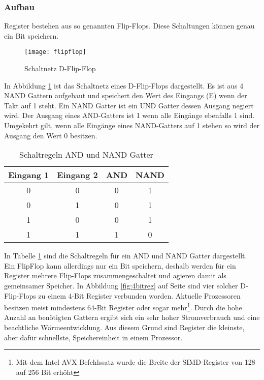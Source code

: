 \documentclass[12pt]{article}
\begin{document}
\subsubsection{Aufbau}
Register bestehen aus so genannten Flip-Flops. Diese Schaltungen können genau ein Bit speichern. 

\begin{figure}[!htb]
\centering
\texttt{[image: flipflop]}
\caption{Schaltnetz D-Flip-Flop}
\centering
\label{fig:flipflop}
\end{figure}

\noindent In Abbildung \ref{fig:flipflop} ist das Schaltnetz eines D-Flip-Flops dargestellt. Es ist aus 4 NAND Gattern aufgebaut und speichert den Wert des Eingangs (E) wenn der Takt auf 1 steht. Ein NAND Gatter ist ein UND Gatter dessen Ausgang negiert wird. Der Ausgang eines AND-Gatters ist 1 wenn alle Eingänge ebenfalls 1 sind. Umgekehrt gilt, wenn alle Eingänge eines NAND-Gatters auf 1 stehen so wird der Ausgang den Wert 0 besitzen.\cite[S.12-14]{elements2005}

\begin{table}[!htb]
\centering
\begin{tabular}{|c|c|c|c|}
\hline
Eingang 1 & Eingang 2 & AND & NAND \\ \hline
0         & 0         & 0   & 1    \\ \hline
0         & 1         & 0   & 1    \\ \hline
1         & 0         & 0   & 1    \\ \hline
1         & 1         & 1   & 0    \\ \hline
\end{tabular}
\caption{Schaltregeln AND und NAND Gatter}
\label{andnand}
\end{table}

\noindent In Tabelle \ref{andnand} sind die Schaltregeln für ein AND und NAND Gatter dargestellt. Ein FlipFlop kann allerdings nur ein Bit speichern, deshalb werden für ein Register mehrere Flip-Flops zusammengeschaltet und agieren damit als gemeinsamer Speicher. In Abbildung \ref{fig:4bitreg} auf Seite \pageref{page:4bitreg} sind vier solcher D-Flip-Flops zu einem 4-Bit Register verbunden worden.  Aktuelle Prozessoren besitzen meist mindestens 64-Bit Register oder sogar mehr\footnote{Mit dem Intel AVX Befehlssatz wurde die Breite der SIMD-Register von 128 auf 256 Bit erhöht\cite{lomont2011introduction}}. Durch die hohe Anzahl an benötigten Gattern ergibt sich ein sehr hoher Stromverbrauch und eine beachtliche Wärmeentwicklung. Aus diesem Grund sind Register die kleinste, aber dafür schnellste, Speichereinheit in einem Prozessor.
\end{document}
